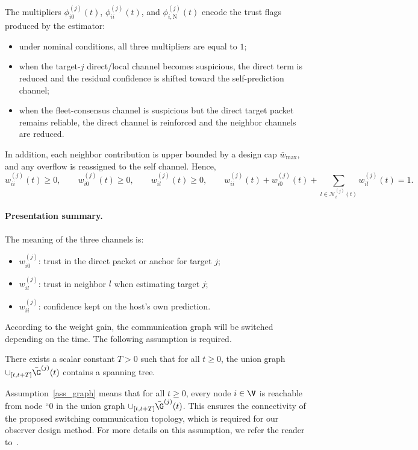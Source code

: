 The multipliers $\phi_{i0}^{(j)}(t)$, $\phi_{ii}^{(j)}(t)$, and $\phi_{i,\mathrm{N}}^{(j)}(t)$ encode the trust flags produced by the estimator:
\begin{itemize}
    \item under nominal conditions, all three multipliers are equal to $1$;
    \item when the target-$j$ direct/local channel becomes suspicious, the direct term is reduced and the residual confidence is shifted toward the self-prediction channel;
    \item when the fleet-consensus channel is suspicious but the direct target packet remains reliable, the direct channel is reinforced and the neighbor channels are reduced.
\end{itemize}
In addition, each neighbor contribution is upper bounded by a design cap $\bar w_{\max}$, and any overflow is reassigned to the self channel. Hence,
\begin{equation}\label{eq:weight_simplex}
w_{ii}^{(j)}(t)\ge 0,\qquad
w_{i0}^{(j)}(t)\ge 0,\qquad
w_{il}^{(j)}(t)\ge 0,\qquad
w_{ii}^{(j)}(t)+w_{i0}^{(j)}(t)+\sum_{l\in\mathcal{N}_{i}^{(j)}(t)}w_{il}^{(j)}(t)=1.
\end{equation}

\paragraph{Presentation summary.}
The meaning of the three channels is:
\begin{itemize}
    \item $w_{i0}^{(j)}$: trust in the direct packet or anchor for target $j$;
    \item $w_{il}^{(j)}$: trust in neighbor $l$ when estimating target $j$;
    \item $w_{ii}^{(j)}$: confidence kept on the host's own prediction.
\end{itemize}
According to the weight gain, the communication graph will be switched depending on the time. The following assumption is required.
\begin{assumption}%
\label{ass_graph}
There exists a scalar constant $T > 0$ such that for all $t\geq 0$, the union graph $\cup _{[t, t+ T]}\bar{\G}^{(j)}(t)$ contains a spanning tree.
\end{assumption}
Assumption~\ref{ass_graph} means that for all $t\geq 0$, every node $i \in\V$ is reachable from node ``0 in the union graph $\cup _{[t, t+ T]}\bar{\G}^{(j)}(t)$. This ensures the connectivity of the proposed switching communication topology, which is required for our observer design method. For more details on this assumption, we refer the reader to~\cite{hao2024eventtriggered}.

